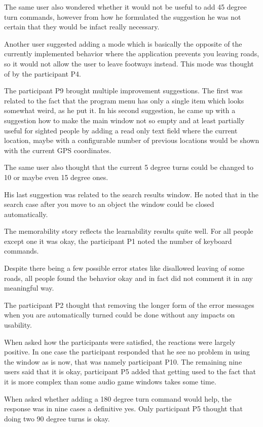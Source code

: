 \documentclass[nolof,digital]{fithesis3}
\begin{document}
The same user also wondered whether it would not be useful to add 45 degree turn commands, however from how he formulated the suggestion he was not certain that they would be infact really necessary.

Another user suggested adding a mode which is basically the opposite of the currently implemented behavior where the application prevents you leaving roads, so it would not allow the user to leave footways instead. This mode was thought of by the participant P4.

The participant P9 brought multiple improvement suggestions. The first was related to the fact that the program menu has only a single item which looks somewhat weird, as he put it. In his second suggestion, he came up with a suggestion how to make the main window not so empty and at least partially useful for sighted people by adding a read only text field where the current location, maybe with a configurable number of previous locations would be shown with the current GPS coordinates.

The same user also thought that the current 5 degree turns could be changed to 10 or maybe even 15 degree ones.

His last suggestion was related to the search results window. He noted that in the search case after you move to an object the window could be closed automatically.

The memorability story reflects the learnability results quite well. For all people except one it was okay, the participant P1 noted the number of keyboard commands.

Despite there being a few possible error states like disallowed leaving of some roads, all people found the behavior okay and in fact did not comment it in any meaningful way.

The participant P2 thought that removing the longer form of the error messages when you are automatically turned could be done without any impacts on usability.

When asked how the participants were satisfied, the reactions were largely positive. In one case the participant responded that he see no problem in using the window as is now, that was namely participant P10. The remaining nine users said that it is okay, participant P5 added that getting used to the fact that it is more complex than some audio game windows takes some time.

When asked whether adding a 180 degree turn command would help, the response was in nine cases a definitive yes. Only participant P5 thought that doing two 90 degree turns is okay.
\end{document}
